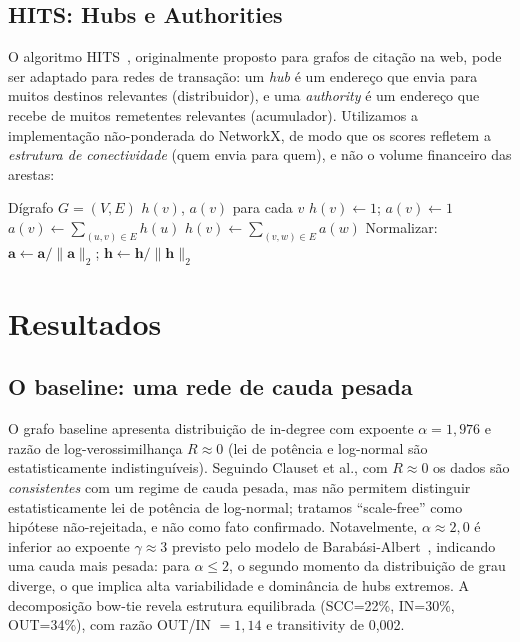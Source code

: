 \documentclass[12pt,a4paper]{article}
\begin{document}
\subsection{HITS: Hubs e Authorities}

O algoritmo HITS~\cite{kleinberg1999}, originalmente proposto para grafos de citação na web, pode ser adaptado para redes de transação: um \textit{hub} é um endereço que envia para muitos destinos relevantes (distribuidor), e uma \textit{authority} é um endereço que recebe de muitos remetentes relevantes (acumulador). Utilizamos a implementação não-ponderada do NetworkX, de modo que os scores refletem a \textit{estrutura de conectividade} (quem envia para quem), e não o volume financeiro das arestas:

\begin{algorithm}[H]
\caption{HITS (Kleinberg)}
\begin{algorithmic}[1]
\Require Dígrafo $G = (V, E)$
\Ensure $h(v)$, $a(v)$ para cada $v$
 $h(v) \gets 1$; $a(v) \gets 1$ \EndFor
\Repeat
   $a(v) \gets \sum_{(u,v) \in E} h(u)$ \EndFor
   $h(v) \gets \sum_{(v,w) \in E} a(w)$ \EndFor
  \State Normalizar: $\mathbf{a} \gets \mathbf{a}/\|\mathbf{a}\|_2$; \quad $\mathbf{h} \gets \mathbf{h}/\|\mathbf{h}\|_2$
\end{algorithmic}
\end{algorithm}

\section{Resultados}

\subsection{O baseline: uma rede de cauda pesada}

O grafo baseline apresenta distribuição de in-degree com expoente $\alpha = 1{,}976$ e razão de log-verossimilhança $R \approx 0$ (lei de potência e log-normal são estatisticamente indistinguíveis). Seguindo Clauset et al., com $R \approx 0$ os dados são \textit{consistentes} com um regime de cauda pesada, mas não permitem distinguir estatisticamente lei de potência de log-normal; tratamos ``scale-free'' como hipótese não-rejeitada, e não como fato confirmado. Notavelmente, $\alpha \approx 2{,}0$ é inferior ao expoente $\gamma \approx 3$ previsto pelo modelo de Barabási-Albert~\cite{barabasi1999}, indicando uma cauda mais pesada: para $\alpha \leq 2$, o segundo momento da distribuição de grau diverge, o que implica alta variabilidade e dominância de hubs extremos. A decomposição bow-tie revela estrutura equilibrada (SCC=22\%, IN=30\%, OUT=34\%), com razão OUT/IN $= 1{,}14$ e transitivity de 0,002.
\end{document}
